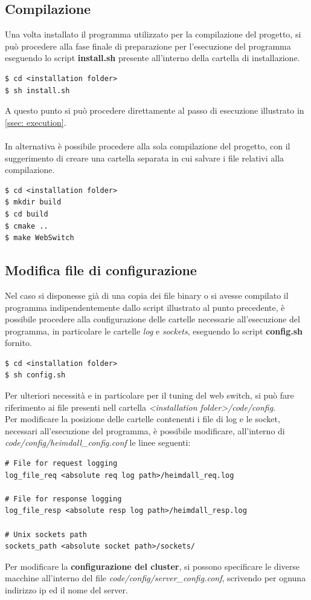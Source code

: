 \documentclass[italian]{tktltiki2}
\begin{document}
\subsection{Compilazione}
Una volta installato il programma utilizzato per la compilazione del progetto, si può procedere alla fase finale di preparazione per l'esecuzione del programma eseguendo lo script \textbf{install.sh} presente all'interno della cartella di installazione.
\begin{lstlisting}
$ cd <installation folder>
$ sh install.sh 
\end{lstlisting}
A questo punto si può procedere direttamente al passo di esecuzione illustrato in \ref{ssec: execution}.
\\
\\
In alternativa è possibile procedere alla sola compilazione del progetto, con il suggerimento di creare una cartella separata in cui salvare i file relativi alla compilazione.
\begin{lstlisting}
$ cd <installation folder>
$ mkdir build
$ cd build
$ cmake ..
$ make WebSwitch
\end{lstlisting}
\subsection{Modifica file di configurazione} \label{ssec: configuration}
Nel caso si disponesse già di una copia dei file binary o si avesse compilato il programma indipendentemente dallo script illustrato al punto precedente, è possibile procedere alla configurazione delle cartelle necessarie all'esecuzione del programma, in particolare le cartelle \emph{log} e \emph{sockets}, eseguendo lo script \textbf{config.sh} fornito.
\begin{lstlisting}
$ cd <installation folder>
$ sh config.sh 
\end{lstlisting}
Per ulteriori necessità e in particolare per il tuning del web switch, si può fare riferimento ai file presenti nell cartella \emph{<installation folder>/code/config}. 
\\
Per modificare la posizione delle cartelle contenenti i file di log e le socket, necessari all'esecuzione del programma, è possibile modificare, all'interno di \emph{code/config/heimdall\_config.conf} le linee seguenti:
\begin{lstlisting}
# File for request logging
log_file_req <absolute req log path>/heimdall_req.log

# File for response logging
log_file_resp <absolute resp log path>/heimdall_resp.log

# Unix sockets path
sockets_path <absolute socket path>/sockets/  
\end{lstlisting}
Per modificare la \textbf{configurazione del cluster}, si possono specificare le diverse macchine all'interno del file \emph{code/config/server\_config.conf}, scrivendo per ognuna indirizzo ip ed il nome del server.
\\
\end{document}
